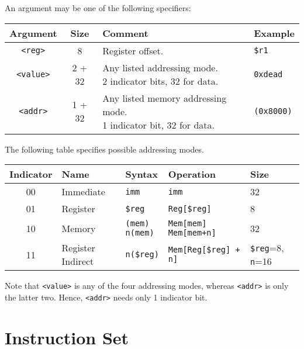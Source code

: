 \documentclass[10pt]{article}
\begin{document}
    An argument may be one of the following specifiers:

    \medskip
    \begin{tabular}{|c|c|l|l|}
        \hline
        \textbf{Argument} & \textbf{Size} & \textbf{Comment} & \textbf{Example} \\
        \hline
        \texttt{<reg>} & 8 & Register offset. & \texttt{\$r1} \\
        \hline
        \texttt{<value>} & 2 + 32 & \makecell[l]{Any listed addressing mode.\\%
        2 indicator bits, 32 for data.} & \texttt{0xdead} \\
        \hline
        \texttt{<addr>} & 1 + 32 & \makecell[l]{Any listed memory addressing mode.\\%
        1 indicator bit, 32 for data.} & \texttt{(0x8000)} \\
        \hline
    \end{tabular}
    \medskip

    The following table specifies possible addressing modes.

    \medskip
    \begin{tabular}{|c|l|l|l|l|}
        \hline
        \textbf{Indicator} & \textbf{Name} & \textbf{Syntax} & \textbf{Operation} & \textbf{Size} \\
        \hline
        00 & Immediate & \texttt{imm} & \texttt{imm} & 32 \\
        01 & Register & \texttt{\$reg} & \texttt{Reg[\$reg]} & 8 \\
        10 & Memory & \makecell[l]{\texttt{(mem)}\\\texttt{n(mem)}} & \makecell[l]{\texttt{Mem[mem]}\\\texttt{Mem[mem+n]}} & 32\\
        11 & Register Indirect & \texttt{n(\$reg)} & \texttt{Mem[Reg[\$reg] + n]} & \texttt{\$reg}=8, \texttt{n}=16 \\
        \hline
    \end{tabular}

    Note that \texttt{<value>} is any of the four addressing modes, whereas \texttt{<addr>} is only the latter two.
    Hence, \texttt{<addr>} needs only 1 indicator bit.

    \section{Instruction Set}\label{sec:instruction-set}
\end{document}
